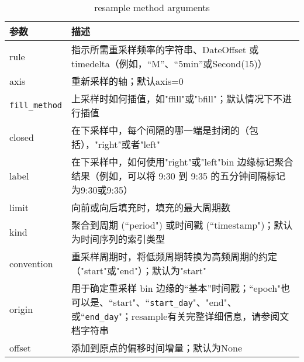 \begin{table}
    \centering
    \caption{resample method arguments}
    \label{tbl11.5}
    \begin{tabularx}{\textwidth}{lX}
        \hline
        参数                 & 描述                                                                                                                   \\
        \hline
        rule               & 指示所需重采样频率的字符串、DateOffset 或 timedelta（例如，“M”、“5min”或Second(15)）                                                       \\
        axis               & 重新采样的轴；默认axis=0                                                                                                      \\
        \verb|fill_method| & 上采样时如何插值，如"ffill"或"bfill"；默认情况下不进行插值                                                                                 \\
        closed             & 在下采样中，每个间隔的哪一端是封闭的（包括），"right"或者"left"                                                                               \\
        label              & 在下采样中，如何使用"right"或"left"bin 边缘标记聚合结果（例如，可以将 9:30 到 9:35 的五分钟间隔标记为9:30或9:35）                                          \\
        limit              & 向前或向后填充时，填充的最大周期数                                                                                                    \\
        kind               & 聚合到周期 (``period") 或时间戳 (``timestamp")；默认为时间序列的索引类型                                                                   \\
        convention         & 重采样周期时，将低频周期转换为高频周期的约定（"start"或"end"）；默认为"start"                                                                     \\
        origin             & 用于确定重采样 bin 边缘的“基本”时间戳；``epoch"也可以是、``start"、``\verb|start_day|"、"end"、 或``\verb|end_day|"；resample有关完整详细信息，请参阅文档字符串 \\
        offset             & 添加到原点的偏移时间增量；默认为None                                                                                                 \\
        \hline
    \end{tabularx}
\end{table}
